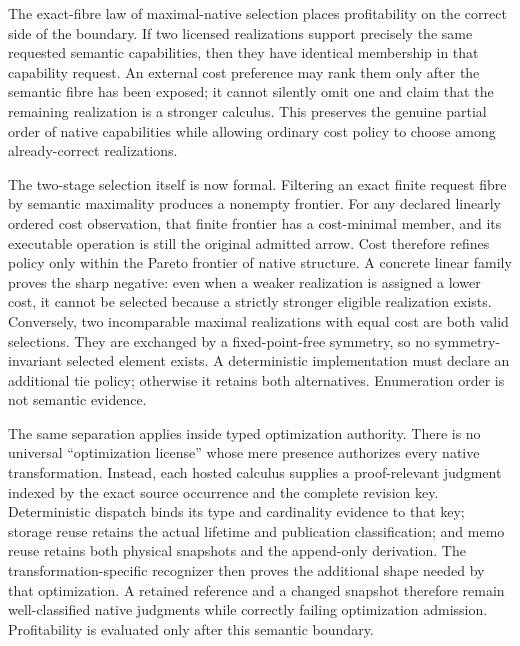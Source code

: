 \documentclass[11pt]{article}
\begin{document}
The exact-fibre law of maximal-native selection places profitability on the
correct side of the boundary.  If two licensed realizations support precisely
the same requested semantic capabilities, then they have identical membership
in that capability request.  An external cost preference may rank them only
after the semantic fibre has been exposed; it cannot silently omit one and
claim that the remaining realization is a stronger calculus.  This preserves
the genuine partial order of native capabilities while allowing ordinary cost
policy to choose among already-correct realizations.

The two-stage selection itself is now formal.  Filtering an exact finite
request fibre by semantic maximality produces a nonempty frontier.  For any
declared linearly ordered cost observation, that finite frontier has a
cost-minimal member, and its executable operation is still the original
admitted arrow.  Cost therefore refines policy only within the Pareto frontier
of native structure.  A concrete linear family proves the sharp negative:
even when a weaker realization is assigned a lower cost, it cannot be selected
because a strictly stronger eligible realization exists.  Conversely, two
incomparable maximal realizations with equal cost are both valid selections.
They are exchanged by a fixed-point-free symmetry, so no symmetry-invariant
selected element exists.  A deterministic implementation must declare an
additional tie policy; otherwise it retains both alternatives.  Enumeration
order is not semantic evidence.

The same separation applies inside typed optimization authority.  There is no
universal ``optimization license'' whose mere presence authorizes every native
transformation.  Instead, each hosted calculus supplies a proof-relevant
judgment indexed by the exact source occurrence and the complete revision key.
Deterministic dispatch binds its type and cardinality evidence to that key;
storage reuse retains the actual lifetime and publication classification; and
memo reuse retains both physical snapshots and the append-only derivation.
The transformation-specific recognizer then proves the additional shape needed
by that optimization.  A retained reference and a changed snapshot therefore
remain well-classified native judgments while correctly failing optimization
admission.  Profitability is evaluated only after this semantic boundary.
\end{document}
